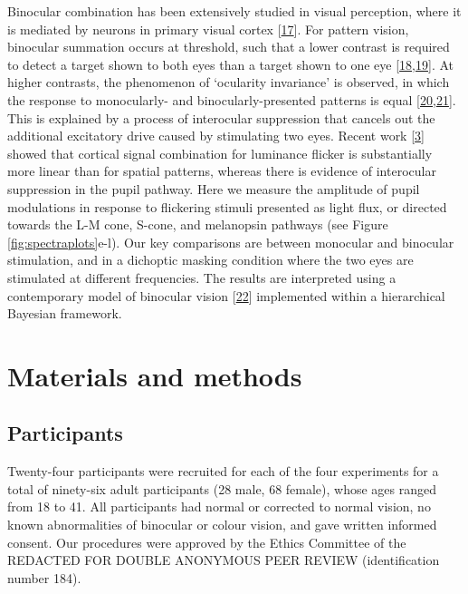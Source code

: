 \documentclass[
]{article}
\begin{document}
Binocular combination has been extensively studied in visual perception, where it is mediated by neurons in primary visual cortex {[}\protect\hyperlink{ref-Hubel1962}{17}{]}. For pattern vision, binocular summation occurs at threshold, such that a lower contrast is required to detect a target shown to both eyes than a target shown to one eye {[}\protect\hyperlink{ref-Baker2018}{18},\protect\hyperlink{ref-Campbell1965}{19}{]}. At higher contrasts, the phenomenon of `ocularity invariance' is observed, in which the response to monocularly- and binocularly-presented patterns is equal {[}\protect\hyperlink{ref-Baker2007}{20},\protect\hyperlink{ref-Moradi2009}{21}{]}. This is explained by a process of interocular suppression that cancels out the additional excitatory drive caused by stimulating two eyes. Recent work {[}\protect\hyperlink{ref-Segala2023}{3}{]} showed that cortical signal combination for luminance flicker is substantially more linear than for spatial patterns, whereas there is evidence of interocular suppression in the pupil pathway. Here we measure the amplitude of pupil modulations in response to flickering stimuli presented as light flux, or directed towards the L-M cone, S-cone, and melanopsin pathways (see Figure \ref{fig:spectraplots}e-l). Our key comparisons are between monocular and binocular stimulation, and in a dichoptic masking condition where the two eyes are stimulated at different frequencies. The results are interpreted using a contemporary model of binocular vision {[}\protect\hyperlink{ref-Meese2006}{22}{]} implemented within a hierarchical Bayesian framework.

\hypertarget{materials-and-methods}{%
\section{Materials and methods}\label{materials-and-methods}}

\hypertarget{participants}{%
\subsection{Participants}\label{participants}}

Twenty-four participants were recruited for each of the four experiments for a total of ninety-six adult participants (28 male, 68 female), whose ages ranged from 18 to 41. All participants had normal or corrected to normal vision, no known abnormalities of binocular or colour vision, and gave written informed consent. Our procedures were approved by the Ethics Committee of the REDACTED FOR DOUBLE ANONYMOUS PEER REVIEW (identification number 184).
\end{document}

